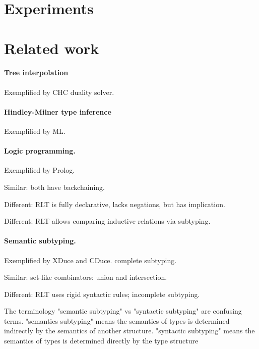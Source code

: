 \documentclass[acmsmall]{acmart}
\theoremstyle{definition}
\begin{document}
\section{Experiments}


\section{Related work}


\paragraph{Tree interpolation}
Exemplified by CHC duality solver.

\paragraph{Hindley-Milner type inference}
Exemplified by ML.

\paragraph{Logic programming.}
Exemplified by Prolog. 


Similar: both have backchaining. 

Different: RLT is fully declarative, lacks negations, but has implication. 

Different: RLT allows comparing inductive relations via subtyping. 

\paragraph{Semantic subtyping.} 
Exemplified by XDuce and CDuce. complete subtyping.

Similar: set-like combinators: union and intersection.

Different: RLT uses rigid syntactic rules; incomplete subtyping.

The terminology "semantic subtyping" vs "syntactic subtyping" are confusing terms. 
"semantics subtyping" means the semantics of types is determined indirectly by the semantics of another structure.
"syntactic subtyping" means the semantics of types is determined directly by the type structure
\end{document}

